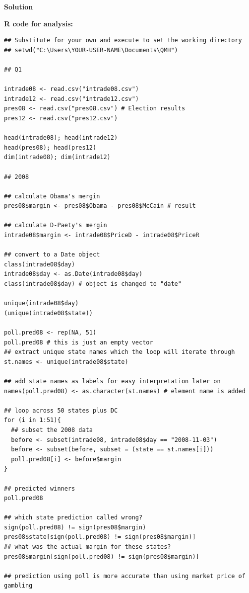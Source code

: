\documentclass[12pt]{article}
\begin{document}
{\color{blue}

\begin{center}
    \textbf{\large Solution}    
\end{center}

\textbf{R code for analysis:}

\begin{verbatim} 
## Substitute for your own and execute to set the working directory
## setwd("C:\Users\YOUR-USER-NAME\Documents\QMH")

## Q1

intrade08 <- read.csv("intrade08.csv") 
intrade12 <- read.csv("intrade12.csv")
pres08 <- read.csv("pres08.csv") # Election results
pres12 <- read.csv("pres12.csv")

head(intrade08); head(intrade12)
head(pres08); head(pres12) 
dim(intrade08); dim(intrade12)

## 2008

## calculate Obama's mergin
pres08$margin <- pres08$Obama - pres08$McCain # result

## calculate D-Paety's mergin
intrade08$margin <- intrade08$PriceD - intrade08$PriceR

## convert to a Date object
class(intrade08$day)
intrade08$day <- as.Date(intrade08$day)
class(intrade08$day) # object is changed to "date"

unique(intrade08$day)
(unique(intrade08$state))

poll.pred08 <- rep(NA, 51)
poll.pred08 # this is just an empty vector
## extract unique state names which the loop will iterate through 
st.names <- unique(intrade08$state)

## add state names as labels for easy interpretation later on
names(poll.pred08) <- as.character(st.names) # element name is added 

## loop across 50 states plus DC
for (i in 1:51){
  ## subset the 2008 data
  before <- subset(intrade08, intrade08$day == "2008-11-03")
  before <- subset(before, subset = (state == st.names[i]))
  poll.pred08[i] <- before$margin
}

## predicted winners
poll.pred08

## which state prediction called wrong? 
sign(poll.pred08) != sign(pres08$margin)
pres08$state[sign(poll.pred08) != sign(pres08$margin)]
## what was the actual margin for these states? 
pres08$margin[sign(poll.pred08) != sign(pres08$margin)]

## prediction using poll is more accurate than using market price of gambling


\end{verbatim}}
\end{document}
